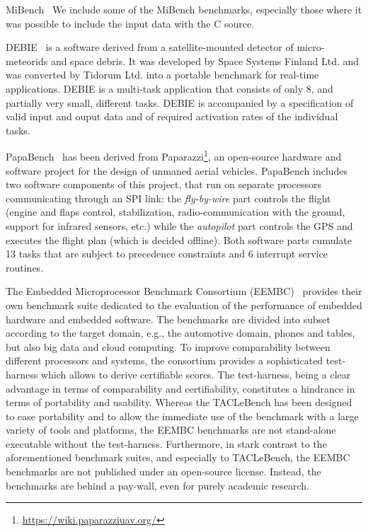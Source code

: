 \documentclass[a4paper,UKenglish]{oasics}
\begin{document}
MiBench~\cite{MiBench} We include some of the MiBench benchmarks, especially
those where it was possible to include the input data with the C source.

DEBIE~\cite{debie} is a software derived from a satellite-mounted detector of micro-meteorids and space debris.
It was developed by Space Systems Finland Ltd. and was converted by Tidorum Ltd. into a portable benchmark for real-time applications.
DEBIE is a multi-task application that consists of only 8, and partially very small, different tasks.
DEBIE is accompanied by a specification of valid input and ouput data and of required activation rates of the individual tasks.

PapaBench~\cite{papabench} has been derived from  Paparazzi\footnote{\url{https://wiki.paparazziuav.org/}},
an open-source hardware and software project for the design of unmaned aerial vehicles.  PapaBench includes
two software components of this project, that run on separate processors communicating through an SPI link:
the \textit{fly-by-wire} part controls the flight (engine and flaps control, stabilization, radio-communication
with the ground, support for infrared sensors, etc.) while the \textit{autopilot} part controls the GPS and
executes the flight plan (which is decided offline). Both software parts  cumulate 13 tasks that are subject
to precedence constraints and 6 interrupt service routines.

The Embedded Microprocessor Benchmark Consortium (EEMBC)~\cite{eembc} provides their own benchmark suite dedicated to the evaluation of
the performance of embedded hardware and embedded software.
The benchmarks are divided into subset according to the target domain, e.g., the automotive domain, phones and tables, but also big data and cloud computing.
To improve comparability between different processors and systems, the consortium provides a sophisticated test-harness which allows to derive certifiable scores.
The test-harness, being a clear advantage in terms of comparability and certifiability, constitutes a hindrance in terms of portability and usability.
Whereas the TACLeBench has been designed to ease portability and to allow the immediate use of the benchmark with a large variety of tools and platforms, the EEMBC benchmarks are not stand-alone executable without the test-harness.
Furthermore, in stark contrast to the aforementioned benchmark suites, and especially to TACLeBench, the EEMBC benchmarks are not published under an open-source license.
Instead, the benchmarks are behind a pay-wall, even for purely academic research.
\end{document}
